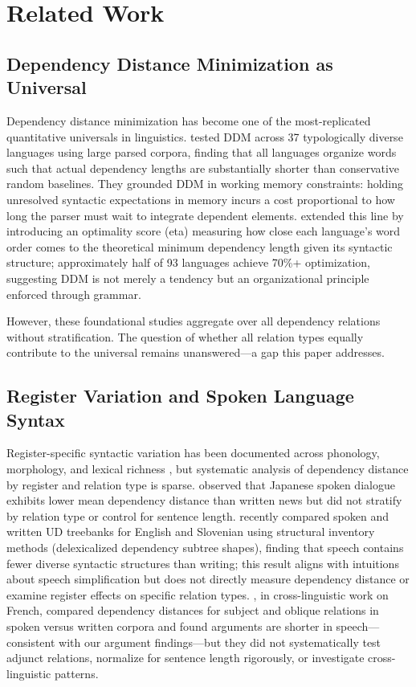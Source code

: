 \documentclass[11pt,letterpaper]{article}
\begin{document}
\section{Related Work}

\subsection{Dependency Distance Minimization as Universal}

Dependency distance minimization has become one of the most-replicated quantitative universals in linguistics. \citet{Futrell2015} tested DDM across 37 typologically diverse languages using large parsed corpora, finding that all languages organize words such that actual dependency lengths are substantially shorter than conservative random baselines. They grounded DDM in working memory constraints: holding unresolved syntactic expectations in memory incurs a cost proportional to how long the parser must wait to integrate dependent elements. \citet{FerreriCancho2022} extended this line by introducing an optimality score (eta) measuring how close each language's word order comes to the theoretical minimum dependency length given its syntactic structure; approximately half of 93 languages achieve 70\%+ optimization, suggesting DDM is not merely a tendency but an organizational principle enforced through grammar.

However, these foundational studies aggregate over all dependency relations without stratification. The question of whether all relation types equally contribute to the universal remains unanswered---a gap this paper addresses.

\subsection{Register Variation and Spoken Language Syntax}

Register-specific syntactic variation has been documented across phonology, morphology, and lexical richness \citep{Biber1988,Conrad2001}, but systematic analysis of dependency distance by register and relation type is sparse. \citet{Liu2008} observed that Japanese spoken dialogue exhibits lower mean dependency distance than written news but did not stratify by relation type or control for sentence length. \citet{Dobrovoljc2025} recently compared spoken and written UD treebanks for English and Slovenian using structural inventory methods (delexicalized dependency subtree shapes), finding that speech contains fewer diverse syntactic structures than writing; this result aligns with intuitions about speech simplification but does not directly measure dependency distance or examine register effects on specific relation types. \citet{Poiret2023}, in cross-linguistic work on French, compared dependency distances for subject and oblique relations in spoken versus written corpora and found arguments are shorter in speech---consistent with our argument findings---but they did not systematically test adjunct relations, normalize for sentence length rigorously, or investigate cross-linguistic patterns.
\end{document}
